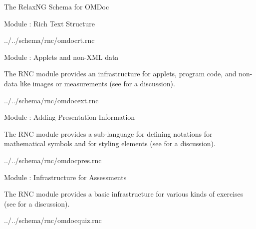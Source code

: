 \begin{tchapter}[id=rnc]{The RelaxNG Schema for OMDoc}
\begin{tsection}[id=rnc:RT]{Module {}: Rich Text Structure}
 
  {../../schema/rnc/omdocrt.rnc}
\end{tsection}

\begin{tsection}[id=rnc:ext]{Module {}: Applets and non-XML data}

  The RNC module {} provides an infrastructure for applets, program
  code, and non-{\xml} data like images or measurements (see {} for
  a discussion).

 {../../schema/rnc/omdocext.rnc}
\end{tsection}

\begin{tsection}[id=rnc:pres]{Module {}: Adding Presentation Information}

The RNC module {} provides a sub-language for defining notations
for mathematical symbols and for styling {\omdoc} elements (see
  {} for a discussion).


{../../schema/rnc/omdocpres.rnc}
\end{tsection}

\begin{tsection}[id=rnc:quiz]{Module {}: Infrastructure for Assessments}

  The RNC module {} provides a basic infrastructure for various
  kinds of exercises (see {} for a discussion).

  
  {../../schema/rnc/omdocquiz.rnc}
\end{tsection}
\end{tchapter}



